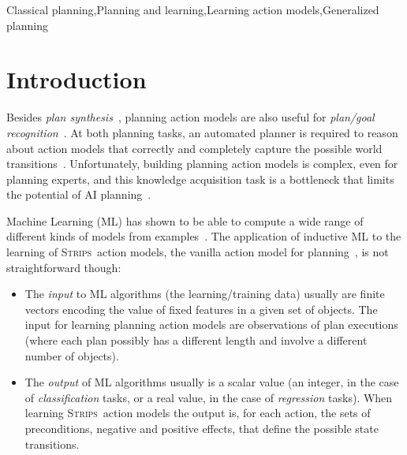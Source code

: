 \documentclass[3p,times]{elsarticle}
\newcommand{\strips}{\textsc{Strips}}     %
\begin{document}
\begin{frontmatter}
\begin{keyword}
Classical planning\sep Planning and learning\sep Learning action models\sep Generalized planning

\end{keyword}

\end{frontmatter}






\section{Introduction}
\label{sec:Section1}
Besides {\em plan synthesis}~\cite{ghallab2004automated}, planning action models are also useful for {\em plan/goal recognition}~\cite{ramirez2012plan}. At both planning tasks, an automated planner is required to reason about action models that correctly and completely capture the possible world transitions~\cite{geffner:book:2013}. Unfortunately, building planning action models is complex, even for planning experts, and this knowledge acquisition task is a bottleneck that limits the potential of AI planning~\cite{kambhampati:modellite:AAAI2007}.

Machine Learning (ML) has shown to be able to compute a wide range of different kinds of models from examples~\cite{michalski2013machine}. The application of inductive ML to the learning of \strips\ action models, the vanilla action model for planning~\cite{fikes1971strips}, is not straightforward though:
\begin{itemize}
\item The {\em input} to ML algorithms (the learning/training data) usually are finite vectors encoding the value of fixed features in a given set of objects. The input for learning planning action models are observations of plan executions (where each plan possibly has a different length and involve a different number of objects).
\item The {\em output} of ML algorithms usually is a scalar value (an integer, in the case of {\em classification} tasks, or a real value, in the case of {\em regression} tasks). When learning \strips\ action models the output is, for each action, the sets of preconditions, negative and positive effects, that define the possible state transitions.
\end{itemize}
\end{document}
